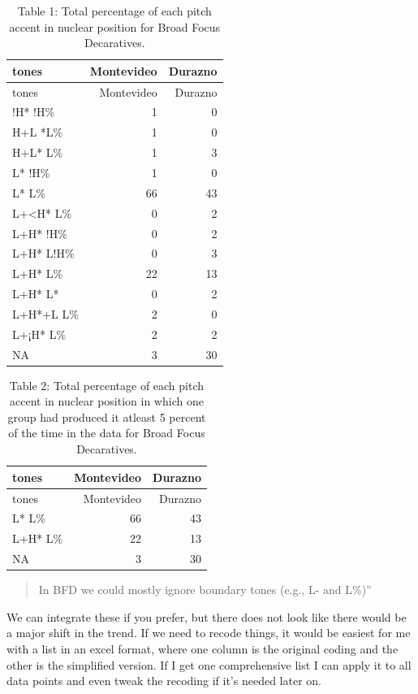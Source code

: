 \documentclass[
  man]{apa6}
\begin{document}
\begin{longtable}[]{@{}lrr@{}}
\caption{\label{tab:unnamed-chunk-4}Table 1: Total percentage of each pitch accent in nuclear position for Broad Focus Decaratives.}\tabularnewline
\toprule\noalign{}
tones & Montevideo & Durazno \\
\midrule\noalign{}
\endfirsthead
\toprule\noalign{}
tones & Montevideo & Durazno \\
\midrule\noalign{}
\endhead
\bottomrule\noalign{}
\endlastfoot
!H* !H\% & 1 & 0 \\
H+L *L\% & 1 & 0 \\
H+L* L\% & 1 & 3 \\
L* !H\% & 1 & 0 \\
L* L\% & 66 & 43 \\
L+\textless H* L\% & 0 & 2 \\
L+H* !H\% & 0 & 2 \\
L+H* L!H\% & 0 & 3 \\
L+H* L\% & 22 & 13 \\
L+H* L* & 0 & 2 \\
L+H*+L L\% & 2 & 0 \\
L+¡H* L\% & 2 & 2 \\
NA & 3 & 30 \\
\end{longtable}

\begin{longtable}[]{@{}lrr@{}}
\caption{\label{tab:unnamed-chunk-5}Table 2: Total percentage of each pitch accent in nuclear position in which one group had produced it atleast 5 percent of the time in the data for Broad Focus Decaratives.}\tabularnewline
\toprule\noalign{}
tones & Montevideo & Durazno \\
\midrule\noalign{}
\endfirsthead
\toprule\noalign{}
tones & Montevideo & Durazno \\
\midrule\noalign{}
\endhead
\bottomrule\noalign{}
\endlastfoot
L* L\% & 66 & 43 \\
L+H* L\% & 22 & 13 \\
NA & 3 & 30 \\
\end{longtable}

\begin{quote}
In BFD we could mostly ignore boundary tones (e.g., L- and L\%)''
\end{quote}

We can integrate these if you prefer, but there does not look like there would be a major shift in the trend. If we need to recode things, it would be easiest for me with a list in an excel format, where one column is the original coding and the other is the simplified version. If I get one comprehensive list I can apply it to all data points and even tweak the recoding if it's needed later on.
\end{document}
